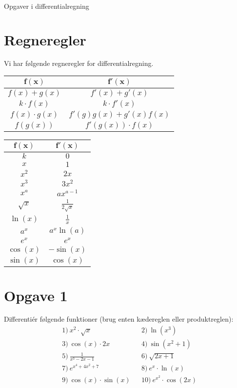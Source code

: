 \begin{center}
	\Huge
	Opgaver i differentialregning
\end{center}
\section*{Regneregler}

Vi har følgende regneregler for differentialregning.
\begin{center}
	\begin{tabular}{c|c}
		$\boldsymbol{f(x)}$ & $\boldsymbol{f'(x)}$\\
		\hline
		$f(x)+g(x)$ & $f'(x) + g'(x)$\\
		\hline
		$k\cdot f(x)$ & $k\cdot f'(x)$\\
		\hline
		$f(x)\cdot g(x)$ & $f'(g)g(x) + g'(x)f(x)$\\
		\hline
		$f(g(x))$ & $f'(g(x))\cdot f(x)$ 
	\end{tabular}
	\hspace{1.5cm}
	\begin{tabular}{c|c}
		$\boldsymbol{f(x)}$ & $\boldsymbol{f'(x)}$\\
		\hline
		$k$ & $0$\\
		\hline
		$x$ & $1$\\
		\hline 
		$x^2$ & $2x$\\
		\hline
		$x^3$ & $3x^2$\\
		\hline
		$x^a$ & $ax^{a-1}$\\
		\hline 
		$\sqrt{x}$ & $\frac{1}{2\sqrt{x}}$ \\
		\hline
		$\ln(x)$ & $\frac{1}{x}$\\
		\hline
		$a^x$ & $a^x\ln(a)$\\
		\hline 
		$e^x$ & $e^x$\\
		\hline 
		$\cos(x)$ & $-\sin(x)$\\
		\hline
		$\sin(x)$ & $\cos(x)$
	\end{tabular}
\end{center}

\section*{Opgave 1}

Differentiér følgende funktioner (brug enten kædereglen eller produktreglen):
\begin{align*}
	&1) \ x^2\cdot \sqrt{x}  &&2) \ \ln(x^3)   \\
	&3) \ \cos(x)\cdot 2x  &&4) \ \sin(x^2+1)   \\
	&5) \ \frac{1}{x^3-2x-1}  &&6) \ \sqrt{2x+1}    \\
	&7) \ e^{x^4+4x^2+7}  &&8) \ e^x\cdot \ln(x)   \\
	&9) \ \cos(x)\cdot\sin(x)  &&10) \ e^{x^2}\cdot \cos(2x)   \\
\end{align*}


